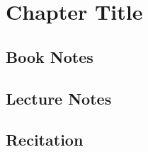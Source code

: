 \documentclass[11pt]{article}
\newcommand{\chapterTitle}{Chapter Title}
\begin{document}
\section{\chapterTitle}

\subsection{Book Notes}

\subsection{Lecture Notes}

\subsection{Recitation}
\end{document}
